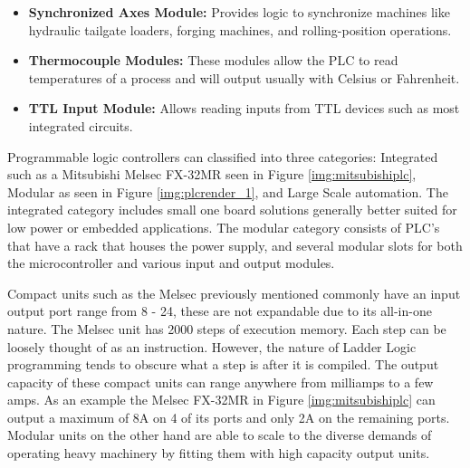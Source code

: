 \begin{itemize}
	\item \textbf{Synchronized Axes Module:} Provides logic to synchronize machines like hydraulic tailgate loaders, forging machines, and rolling-position operations.
	\item \textbf{Thermocouple Modules:} These modules allow the PLC to read temperatures of a process and will output usually with Celsius or Fahrenheit.
	\item \textbf{TTL Input Module:} Allows reading inputs from TTL devices such as most integrated circuits.
\end{itemize}

Programmable logic controllers can classified into three categories: Integrated such 
as a Mitsubishi Melsec FX-32MR seen in Figure \ref{img:mitsubishiplc}, Modular as seen 
in Figure \ref{img:plcrender_1}, and Large Scale automation. The integrated category 
includes small one board solutions generally better suited for low power or embedded 
applications. The modular category consists of PLC's that have a rack that houses the 
power supply, and several modular slots for both the microcontroller and various input 
and output modules.

Compact units such as the Melsec previously mentioned commonly have an input output 
port range from 8 - 24, these are not expandable due to its all-in-one nature. 
The Melsec unit has 2000 steps of execution memory. Each step can be loosely thought 
of as an instruction. However, the nature of Ladder Logic programming tends to obscure 
what a step is after it is compiled. The output capacity of these compact units can range 
anywhere from milliamps to a few amps. As an example the Melsec FX-32MR in 
Figure \ref{img:mitsubishiplc} can output a maximum of 8A on 4 of its ports and only 
2A on the remaining ports. Modular units on the other hand are able to scale to the 
diverse demands of operating heavy machinery by fitting them with high capacity output units.

